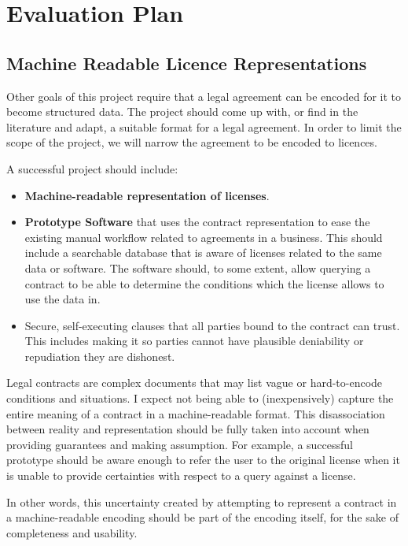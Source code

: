 
\chapter{Evaluation Plan}\label{ch:evaluation}

\section{Machine Readable Licence Representations}



Other goals of this project require that a legal agreement can be encoded for it to become structured data.
The project should come up with, or find in the literature and adapt, a suitable format for a legal agreement.
In order to limit the scope of the project, we will narrow the agreement to be encoded to licences.

A successful project should include:
\begin{itemize}
    \item \textbf{Machine-readable representation of licenses}.
    \item \textbf{Prototype Software} that uses the contract representation to ease the existing manual workflow related
    to agreements in a business.
    This should include a searchable database that is aware of licenses related to the same data or software.
    The software should, to some extent, allow querying a contract to be able to determine the conditions which the
    license allows to use the data in.
    \item Secure, self-executing clauses that all parties bound to the contract can trust.
    This includes making it so parties cannot have plausible deniability or repudiation they are dishonest.
\end{itemize}

Legal contracts are complex documents that may list vague or hard-to-encode conditions and situations.
I expect not being able to (inexpensively) capture the entire meaning of a contract in a machine-readable format.
This disassociation between reality and representation should be fully taken into account when providing guarantees
and making assumption.
For example, a successful prototype should be aware enough to refer the user to the original license when it is unable
to provide certainties with respect to a query against a license.

In other words, this uncertainty created by attempting to represent a contract in a machine-readable encoding
should be part of the encoding itself, for the sake of completeness and usability.



